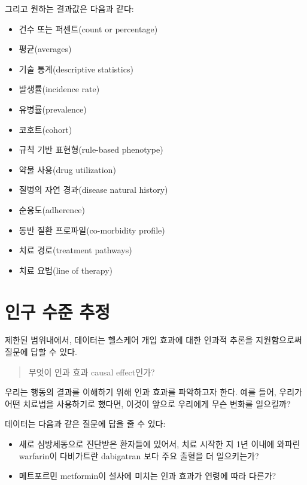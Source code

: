 \documentclass[11pt]{book}
\providecommand{\tightlist}{%
  \setlength{\itemsep}{0pt}\setlength{\parskip}{0pt}}
\theoremstyle{definition}
\theoremstyle{definition}
\theoremstyle{definition}
\theoremstyle{remark}
\begin{document}
그리고 원하는 결과값은 다음과 같다:

\begin{itemize}
\tightlist
\item
  건수 또는 퍼센트(count or percentage)
\item
  평균(averages)
\item
  기술 통계(descriptive statistics)
\item
  발생률(incidence rate)
\item
  유병률(prevalence)
\item
  코호트(cohort)
\item
  규칙 기반 표현형(rule-based phenotype)
\item
  약물 사용(drug utilization)
\item
  질병의 자연 경과(disease natural history)
\item
  순응도(adherence)
\item
  동반 질환 프로파일(co-morbidity profile)
\item
  치료 경로(treatment pathways)
\item
  치료 요법(line of therapy)
\end{itemize}

\section{인구 수준 추정}\label{--}


제한된 범위내에서, 데이터는 헬스케어 개입 효과에 대한 인과적 추론을
지원함으로써 질문에 답할 수 있다.

\begin{quote}
무엇이 인과 효과 causal effect인가?
\end{quote}

우리는 행동의 결과를 이해하기 위해 인과 효과를 파악하고자 한다. 예를
들어, 우리가 어떤 치료법을 사용하기로 했다면, 이것이 앞으로 우리에게
무슨 변화를 일으킬까?

데이터는 다음과 같은 질문에 답을 줄 수 있다:

\begin{itemize}
\tightlist
\item
  새로 심방세동으로 진단받은 환자들에 있어서, 치료 시작한 지 1년 이내에
  와파린 warfarin이 다비가트란 dabigatran 보다 주요 출혈을 더
  일으키는가?
\item
  메트포르민 metformin이 설사에 미치는 인과 효과가 연령에 따라 다른가?
\end{itemize}
\end{document}
